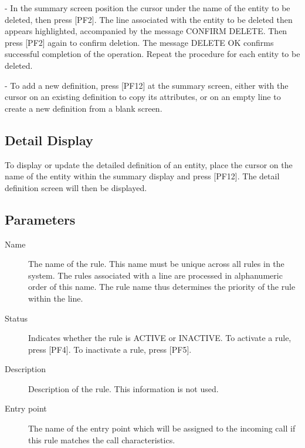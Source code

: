 \documentclass[letterpaper,10pt,english]{sphinxmanual}
\begin{document}
 - In the summary screen position the cursor under the name of the entity to be deleted, then press {[}PF2{]}. The line associated with the entity to be deleted then appears highlighted, accompanied by the message CONFIRM DELETE. Then press {[}PF2{]} again to confirm deletion. The message DELETE OK confirms successful completion of the operation. Repeat the procedure for each entity to be deleted.

 - To add a new definition, press {[}PF12{]} at the summary screen, either with the cursor on an existing definition to copy its attributes, or on an empty line to create a new definition from a blank screen.

\ignorespaces 

\subsection{Detail Display}
\label{\detokenize{connectivity_guide:index-92}}\label{\detokenize{connectivity_guide:id46}}
To display or update the detailed definition of an entity, place the cursor on the name of the entity within the summary display and press {[}PF12{]}. The detail definition screen will then be displayed.


\ignorespaces 

\subsection{Parameters}
\label{\detokenize{connectivity_guide:index-93}}\label{\detokenize{connectivity_guide:id47}}\begin{description}
\item[{Name}] \leavevmode
The name of the rule. This name must be unique across all rules in the system. The rules associated with a line are processed in alphanumeric order of this name. The rule name thus determines the priority of the rule within the line.

\item[{Status}] \leavevmode
Indicates whether the rule is ACTIVE or INACTIVE. To activate a rule, press {[}PF4{]}. To inactivate a rule, press {[}PF5{]}.

\item[{Description}] \leavevmode
Description of the rule. This information is not used.

\item[{Entry point}] \leavevmode
The name of the entry point which will be assigned to the incoming call if this rule matches the call characteristics.

\end{description}
\end{document}
